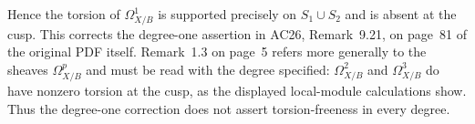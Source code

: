 Hence the torsion of $\Omega^1_{X/B}$ is supported precisely on
$S_1\cup S_2$ and is absent at the cusp. This corrects the degree-one
assertion in AC26, Remark~9.21, on page~81 of the original PDF itself.
Remark~1.3 on page~5 refers more generally to the sheaves
$\Omega^p_{X/B}$ and must be read with the degree specified:
$\Omega^2_{X/B}$ and $\Omega^3_{X/B}$ do have nonzero torsion at the
cusp, as the displayed local-module calculations show. Thus the
degree-one correction does not assert torsion-freeness in every degree.
